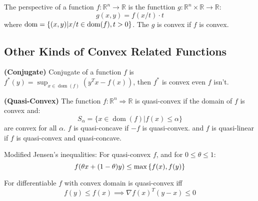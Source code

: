 \begin{proposition}
    The perspective of a function $f:\mathbb{R}^n\rightarrow \mathbb{R}$ is the functtion $g : \mathbb{R}^n\times \mathbb{R}\rightarrow \mathbb{R}$:
    \begin{equation*}
        g(x, y) = f(x/t)\cdot t
    \end{equation*}
    where $\operatorname{dom}=\left\{ (x, y) | x/t \in \operatorname{dom}(f), t>0 \right\}$. The $g$ is convex if $f$ is convex.
\end{proposition}

\subsection{Other Kinds of Convex Related Functions}

\begin{definition}{\textbf{(Conjugate)}}
    Conjugate of a function $f$ is $f^*(y) = \sup_{x\in\operatorname{dom}(f)}(y^Tx - f(x))$, then $f^*$ is convex even $f$ isn't.
\end{definition}

\begin{definition}{\textbf{(Quasi-Convex)}}
    The function $f:\mathbb{R}^n\Rightarrow \mathbb{R}$ is quasi-convex if the domain of $f$ is convex and:
    \begin{equation*}
        S_\alpha = \Big\{ x \in \operatorname{dom}(f) \Big| f(x)\le\alpha \Big\}
    \end{equation*}
    are convex for all $\alpha$. $f$ is quasi-concave if $-f$ is quasi-convex. and $f$ is quasi-linear if $f$ is quasi-convex and quasi-concave.
\end{definition}

\begin{proposition}
    Modified Jensen's inequalities: For quasi-convex $f$, and for $0\le\theta\le1$:
    \begin{equation*}
        f(\theta x + (1-\theta)y) \le \max\left\{ f(x), f(y) \right\}
    \end{equation*}
\end{proposition}

\begin{proposition}
    For differentiable $f$ with convex domain is quasi-convex iff
    \begin{equation*}
        f(y)\le f(x) \implies \nabla f(x)^T(y-x)\le0
    \end{equation*}
\end{proposition}

